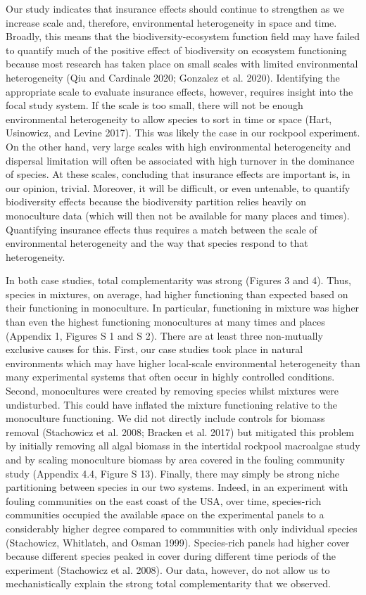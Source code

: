 \documentclass[
  letterpaper,
  DIV=11,
  numbers=noendperiod]{scrartcl}
\begin{document}
Our study indicates that insurance effects should continue to strengthen
as we increase scale and, therefore, environmental heterogeneity in
space and time. Broadly, this means that the biodiversity-ecosystem
function field may have failed to quantify much of the positive effect
of biodiversity on ecosystem functioning because most research has taken
place on small scales with limited environmental heterogeneity (Qiu and
Cardinale 2020; Gonzalez et al. 2020). Identifying the appropriate scale
to evaluate insurance effects, however, requires insight into the focal
study system. If the scale is too small, there will not be enough
environmental heterogeneity to allow species to sort in time or space
(Hart, Usinowicz, and Levine 2017). This was likely the case in our
rockpool experiment. On the other hand, very large scales with high
environmental heterogeneity and dispersal limitation will often be
associated with high turnover in the dominance of species. At these
scales, concluding that insurance effects are important is, in our
opinion, trivial. Moreover, it will be difficult, or even untenable, to
quantify biodiversity effects because the biodiversity partition relies
heavily on monoculture data (which will then not be available for many
places and times). Quantifying insurance effects thus requires a match
between the scale of environmental heterogeneity and the way that
species respond to that heterogeneity.

In both case studies, total complementarity was strong (Figures 3 and
4). Thus, species in mixtures, on average, had higher functioning than
expected based on their functioning in monoculture. In particular,
functioning in mixture was higher than even the highest functioning
monocultures at many times and places (Appendix 1, Figures S 1 and S 2).
There are at least three non-mutually exclusive causes for this. First,
our case studies took place in natural environments which may have
higher local-scale environmental heterogeneity than many experimental
systems that often occur in highly controlled conditions. Second,
monocultures were created by removing species whilst mixtures were
undisturbed. This could have inflated the mixture functioning relative
to the monoculture functioning. We did not directly include controls for
biomass removal (Stachowicz et al. 2008; Bracken et al. 2017) but
mitigated this problem by initially removing all algal biomass in the
intertidal rockpool macroalgae study and by scaling monoculture biomass
by area covered in the fouling community study (Appendix 4.4, Figure S
13). Finally, there may simply be strong niche partitioning between
species in our two systems. Indeed, in an experiment with fouling
communities on the east coast of the USA, over time, species-rich
communities occupied the available space on the experimental panels to a
considerably higher degree compared to communities with only individual
species (Stachowicz, Whitlatch, and Osman 1999). Species-rich panels had
higher cover because different species peaked in cover during different
time periods of the experiment (Stachowicz et al. 2008). Our data,
however, do not allow us to mechanistically explain the strong total
complementarity that we observed.
\end{document}
